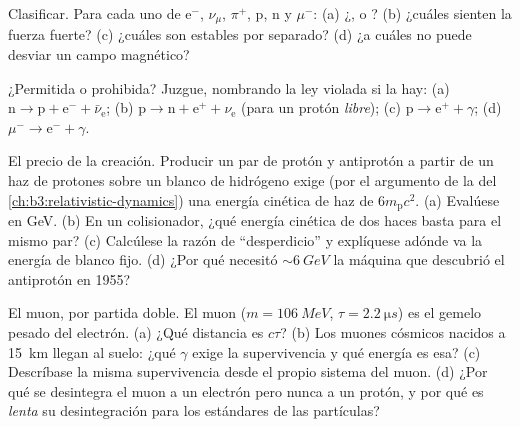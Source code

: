 \begin{exercise}[$\star$]\label{exo:b3:particle-physics:2}
Clasificar. Para cada uno de e$^-$, $\nu_\mu$, $\pi^+$, p, n y
$\mu^-$: (a) ¿,  o ? (b) ¿cuáles sienten la fuerza
fuerte? (c) ¿cuáles son estables por separado? (d) ¿a cuáles no puede desviar un
campo magnético?
\end{exercise}

\begin{exercise}[$\star$]\label{exo:b3:particle-physics:3}
¿Permitida o prohibida? Juzgue, nombrando la ley violada si la hay:
(a) $\text{n} \to \text{p} + \text{e}^- + \bar\nu_{\text{e}}$;
(b) $\text{p} \to \text{n} + \text{e}^+ + \nu_{\text{e}}$ (para
un protón \emph{libre});
(c) $\text{p} \to \text{e}^+ + \gamma$;
(d) $\mu^- \to \text{e}^- + \gamma$.
\end{exercise}

\begin{exercise}[$\star$]\label{exo:b3:particle-physics:4}
El precio de la creación. Producir un par de protón y antiprotón a partir de
un haz de protones sobre un blanco de hidrógeno exige (por el
argumento de la  del \cref{ch:b3:relativistic-dynamics}) una
energía cinética de haz de $6m_{\text{p}}c^2$. (a) Evalúese en GeV.
(b) En un colisionador, ¿qué energía cinética de dos haces basta para
el mismo par? (c) Calcúlese la razón de ``desperdicio'' y explíquese adónde
va la energía de blanco fijo. (d) ¿Por qué necesitó $\sim\qty{6}{GeV}$
la máquina que descubrió el antiprotón en 1955?
\end{exercise}

\begin{exercise}[$\star\star$]\label{exo:b3:particle-physics:5}
El muon, por partida doble. El muon ($m = \qty{106}{MeV}$,
$\tau = \qty{2.2}{\micro s}$) es el gemelo pesado del electrón. (a)
¿Qué distancia es $c\tau$? (b) Los muones cósmicos nacidos a
\qty{15}{km} llegan al suelo: ¿qué $\gamma$ exige la supervivencia
y qué energía es esa? (c) Descríbase la misma supervivencia
desde el propio sistema del muon. (d) ¿Por qué se desintegra el muon a un
electrón pero nunca a un protón, y por qué es \emph{lenta} su desintegración
para los estándares de las partículas?
\end{exercise}

